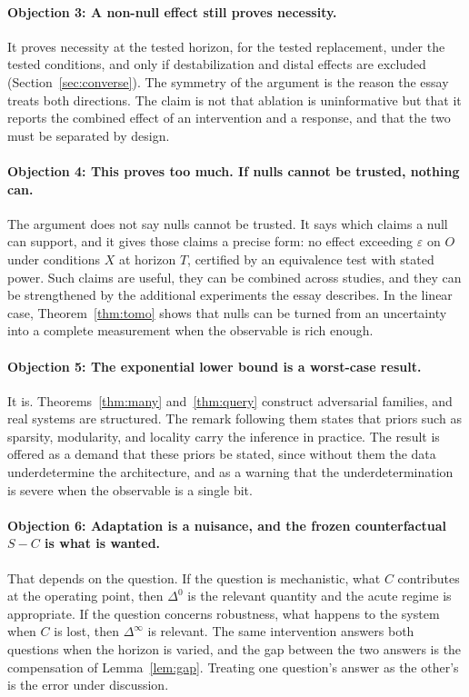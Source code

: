 \documentclass[11pt]{article}
\theoremstyle{definition}
\theoremstyle{remark}
\begin{document}
\paragraph{Objection 3: A non-null effect still proves necessity.}
It proves necessity at the tested horizon, for the tested replacement, under the tested conditions, and only if destabilization and distal effects are excluded (Section~\ref{sec:converse}). The symmetry of the argument is the reason the essay treats both directions. The claim is not that ablation is uninformative but that it reports the combined effect of an intervention and a response, and that the two must be separated by design.

\paragraph{Objection 4: This proves too much. If nulls cannot be trusted, nothing can.}
The argument does not say nulls cannot be trusted. It says which claims a null can support, and it gives those claims a precise form: no effect exceeding $\varepsilon$ on $O$ under conditions $X$ at horizon $T$, certified by an equivalence test with stated power. Such claims are useful, they can be combined across studies, and they can be strengthened by the additional experiments the essay describes. In the linear case, Theorem~\ref{thm:tomo} shows that nulls can be turned from an uncertainty into a complete measurement when the observable is rich enough.

\paragraph{Objection 5: The exponential lower bound is a worst-case result.}
It is. Theorems~\ref{thm:many} and~\ref{thm:query} construct adversarial families, and real systems are structured. The remark following them states that priors such as sparsity, modularity, and locality carry the inference in practice. The result is offered as a demand that these priors be stated, since without them the data underdetermine the architecture, and as a warning that the underdetermination is severe when the observable is a single bit.

\paragraph{Objection 6: Adaptation is a nuisance, and the frozen counterfactual $S-C$ is what is wanted.}
That depends on the question. If the question is mechanistic, what $C$ contributes at the operating point, then $\Delta^0$ is the relevant quantity and the acute regime is appropriate. If the question concerns robustness, what happens to the system when $C$ is lost, then $\Delta^\infty$ is relevant. The same intervention answers both questions when the horizon is varied, and the gap between the two answers is the compensation of Lemma~\ref{lem:gap}. Treating one question's answer as the other's is the error under discussion.
\end{document}
